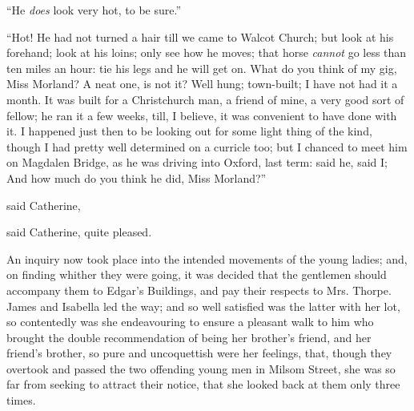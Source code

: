 “He {\em does} look very hot, to be sure.”

“Hot! He had not turned a hair till we came to Walcot Church; but look at his forehand; look at his loins; only see how he moves; that horse {\em cannot} go less than ten miles an hour: tie his legs and he will get on. What do you think of my gig, Miss Morland? A neat one, is not it? Well hung; town-built; I have not had it a month. It was built for a Christchurch man, a friend of mine, a very good sort of fellow; he ran it a few weeks, till, I believe, it was convenient to have done with it. I happened just then to be looking out for some light thing of the kind, though I had pretty well determined on a curricle too; but I chanced to meet him on Magdalen Bridge, as he was driving into Oxford, last term:  said he,   said I;  And how much do you think he did, Miss Morland?”



 said Catherine, 


 said Catherine, quite pleased.


An inquiry now took place into the intended movements of the young ladies; and, on finding whither they were going, it was decided that the gentlemen should accompany them to Edgar's Buildings, and pay their respects to Mrs. Thorpe. James and Isabella led the way; and so well satisfied was the latter with her lot, so contentedly was she endeavouring to ensure a pleasant walk to him who brought the double recommendation of being her brother's friend, and her friend's brother, so pure and uncoquettish were her feelings, that, though they overtook and passed the two offending young men in Milsom Street, she was so far from seeking to attract their notice, that she looked back at them only three times.

